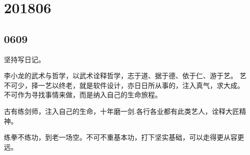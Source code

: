 \section{201806}

\subsection{0609}

坚持写日记。

李小龙的武术与哲学，以武术诠释哲学，志于道、据于德、依于仁、游于艺。
艺不可少，择一艺以终老，就是软件设计，亦日日所从事的，注入真气，求大成。
不可作为寻找事情来做，而是纳入自己的生命旅程。

古有练剑师，注入自己的生命，十年磨一剑.各行各业都有此类艺人，诠释大匠精神。

练拳不练功，到老一场空。不可不重基本功，打下坚实基础，可以走得更从容更远。
